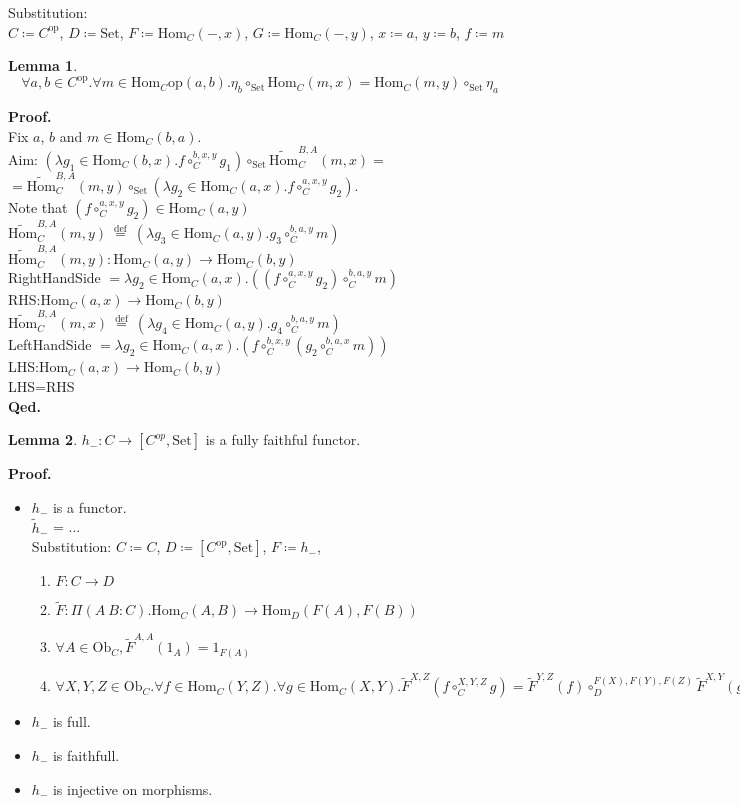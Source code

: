 \documentclass[10pt,a4paper]{article}
\theoremstyle{definition}
\newtheorem{lemma}{Lemma}[section]
\newcommand{\Ob}{{\textrm{Ob}}}
\newcommand{\Hom}{{\textrm{Hom}}}
\newcommand{\HomMor}{{\widetilde{\Hom}\textrm{}}}
\newcommand{\FMor}{{\widetilde{F}\textrm{}}}
\newcommand{\op}{{\textrm{op}}}
\newcommand{\defi}{{\textrm{def}}}
\newcommand{\eqdef}{{\ \stackrel{\defi}{=}\ }}
\newcommand{\Set}{{\textrm{Set}}}
\newcommand{\myprf}{\noindent\textbf{Proof.}}
\newcommand{\myqed}{\noindent\textbf{Qed.}}
\begin{document}
Substitution:\\
$C \coloneqq C^\op$, $D \coloneqq \Set$, $F \coloneqq \Hom_C(-,x)$, $G \coloneqq \Hom_C(-,y)$, $x \coloneqq a$, $y \coloneqq b$, $f \coloneqq m$
\begin{lemma}
$$\forall a,b\in C^\op. \forall m\in \Hom_C\op (a,b).\eta_b \circ_\Set \Hom_C(m,x)=\Hom_C(m,y)\circ_\Set\eta_a$$
\end{lemma}
\myprf\\
Fix $a$, $b$ and $m\in\Hom_C(b,a)$.\\
Aim: $(\lambda g_1 \in \Hom_C(b,x). f\circ^{b,x,y}_C g_1)\circ_\Set \HomMor_C^{B,A}(m,x) = $\\
$=\HomMor_C^{B,A}(m,y) \circ_\Set (\lambda g_2 \in \Hom_C(a,x). f\circ^{a,x,y}_C g_2)$.\\
Note that $(f\circ^{a,x,y}_C g_2) \in \Hom_C(a,y)$\\
$\HomMor_C^{B,A}(m,y) \eqdef (\lambda g_3 \in \Hom_C(a,y). g_3\circ^{b,a,y}_C m)$\\
$\HomMor_C^{B,A}(m,y) : \Hom_C(a,y) \to \Hom_C(b,y)$\\
RightHandSide $= \lambda g_2 \in \Hom_C(a,x). ((f \circ_C^{a,x,y} g_2) \circ_C^{b,a,y} m )$\\
RHS:$\Hom_C(a,x) \to \Hom_C(b,y)$\\
$\HomMor_C^{B,A}(m,x) \eqdef (\lambda g_4 \in \Hom_C(a,y). g_4\circ^{b,a,y}_C m)$\\
LeftHandSide $= \lambda g_2 \in \Hom_C(a,x). (f \circ_C^{b,x,y} (g_2 \circ_C^{b,a,x} m ))$\\
LHS:$\Hom_C(a,x) \to \Hom_C(b,y)$\\
LHS=RHS\\
\myqed
\begin{lemma}
$h_{-}:C\rightarrow [C^{op},\Set]$ is a fully faithful functor.
\end{lemma}
\myprf
\begin{itemize}
\item $h_-$ is a functor.\\
$\widetilde{h}_-$ = ...\\
Substitution: $C\coloneqq C$, $D\coloneqq [C^\op,\Set]$, $F\coloneqq h_-$,
\begin{enumerate}
\item $F:C \to D$
\item $\FMor:\Pi(A\ B:C).\Hom_C(A,B) \to \Hom_D(F(A), F(B))$
\item $\forall A\in \Ob_C, \FMor^{A,A}(1_A)=1_{F(A)}$
\item $\forall X,Y,Z \in \Ob_C.\forall f\in\Hom_C(Y,Z).\forall g\in\Hom_C(X,Y). \FMor^{X,Z}(f\circ_C^{X,Y,Z} g)=\FMor^{Y,Z}(f)\circ_D^{F(X),F(Y),F(Z)} \FMor^{X,Y}(g)$
\end{enumerate}
\item $h_-$ is full.
\item $h_-$ is faithfull.
\item $h_-$ is injective on morphisms.
\end{itemize}
\end{document}
